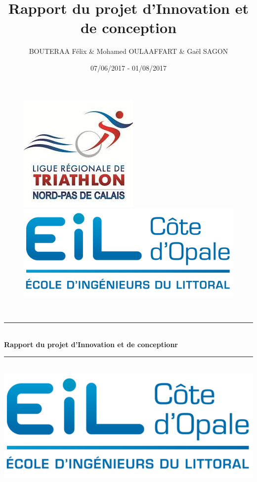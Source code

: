 \documentclass{article}
\title{\textbf{Rapport du projet d'Innovation et de conception}}
\author{BOUTERAA Félix \&  Mohamed OULAAFFART \& Gaël SAGON }
\date{07/06/2017 - 01/08/2017}
\newcommand{\HRule}{\rule{\linewidth}{0.5mm}}
\begin{document}
\begin{titlepage}
  \begin{sffamily}
  \begin{center}
\begin{figure}
\includegraphics[scale=0.8]{logo_png.png} \hfill
\includegraphics[scale=0.7]{eilco.png} 
\end{figure}


    \textsc{\Large }\\[1.5cm]

    \HRule \\[0.4cm]
    { \huge \bfseries Rapport du projet d'Innovation et de conceptionr\\[0.4cm] }

    \HRule \\[2cm]
    \includegraphics[scale=1]{logo.png}
    \\[2cm]


\end{center}
\end{sffamily}
\end{titlepage}
\end{document}
